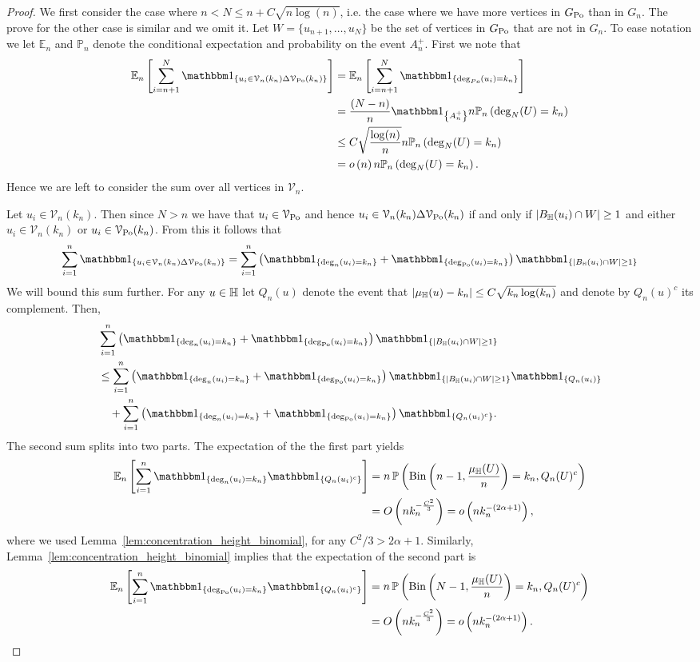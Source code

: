 \begin{proof}
We first consider the case where $n < N \le n + C\sqrt{n \log(n)}$, i.e. the case where we have more vertices in $G_{\text{Po}}$ than in $G_n$. The prove for the other case is similar and we omit it. Let $W = \{u_{n+1}, \dots, u_N\}$ be the set of vertices in $G_{\text{Po}}$ that are not in $G_n$. To ease notation we let $\mathbb{E}_n$ and $\mathbb{P}_n$ denote the conditional expectation and probability on the event $A_n^+$. First we note that
\begin{align*}
	\Expn{\sum_{i = n+1}^N \ind{u_i \in \mathcal{V}_n(k_n) \Delta \VPo(k_n)}}
	&= \Expn{\sum_{i = n+1}^N \ind{\deg_{Po}(u_i) = k_n}} \\
	&= \frac{(N-n)}{n}\ind{A_n^+} n \Probn{\deg_N(U) = k_n} \\
	&\le C \sqrt{\frac{\log(n)}{n}} n \Probn{\deg_N(U) = k_n} \\
	&= \smallO{n} n \Probn{\deg_N(U) = k_n}. 
\end{align*}
Hence we are left to consider the sum over all vertices in $\mathcal{V}_n$.

Let $u_i \in \mathcal{V}_n(k_n)$. Then since $N > n$ we have that $u_i \in \mathcal{V}_{{\mathrm{Po}}}$ and hence $u_i \in \mathcal{V}_n(k_n) \Delta \mathcal{V}_{{\mathrm{Po}}}(k_n)$ if and only if $|B_{\mathbb{H}}(u_i) \cap W| \ge 1$ and either $u_i \in \mathcal{V}_n(k_n)$ or $u_i \in \mathcal{V}_{{\mathrm{Po}}}(k_n)$.
From this it follows that
\[
	\sum_{i = 1}^n \ind{u_i \in \mathcal{V}_n(k_n) \Delta \VPo(k_n)}
	= \sum_{i = 1}^n \left(\ind{\deg_n(u_i) = k_n} + \ind{\deg_\Po(u_i) = k_n} \right)\ind{|B_\H(u_i) \cap W| \ge 1}
\]
We will bound this sum further. For any $u \in \mathbb{H}$ let $Q_n(u)$ denote the event that $|\mu_{\mathbb{H}}(u) - k_n| \le C \sqrt{k_n \log(k_n)}$ and denote by $Q_n(u)^c$ its complement. Then, 
\begin{align*}
	&\sum_{i = 1}^n \left(\ind{\deg_n(u_i) = k_n} + \ind{\deg_\Po(u_i) = k_n} \right)\ind{|B_\H(u_i) \cap W| \ge 1}\\
	&\le \sum_{i = 1}^n \left(\ind{\deg_n(u_i) = k_n} + \ind{\deg_\Po(u_i) = k_n} \right)
		\ind{|B_\H(u_i) \cap W| \ge 1}\ind{Q_n(u_i)}\\
	&\hspace{10pt}+ \sum_{i = 1}^n \left(\ind{\deg_n(u_i) = k_n} + \ind{\deg_\Po(u_i) = k_n} \right)\ind{Q_n(u_i)^c}.
\end{align*}
The second sum splits into two parts. The expectation of the the first part yields
\begin{align*}
	\Expn{\sum_{i = 1}^n \ind{\deg_n(u_i) = k_n} \ind{Q_n(u_i)^c}}
	&= n \, \Prob{\mathrm{Bin}\left(n-1, \frac{\mu_\H(U)}{n}\right) = k_n, Q_n(U)^c}\\
	&= \bigO{n k_n^{-\frac{C^2}{3}}} = \smallO{n k_n^{-(2\alpha + 1)}},
\end{align*}
where we used Lemma~\ref{lem:concentration_height_binomial}, for any $C^2/3 > 2\alpha + 1$.
Similarly, Lemma~\ref{lem:concentration_height_binomial} implies that the expectation of the second part is
\begin{align*}
	\Expn{\sum_{i = 1}^n \ind{\deg_\Po(u_i) = k_n} \ind{Q_n(u_i)^c}}
	&= n \, \Prob{\mathrm{Bin}\left(N-1, \frac{\mu_\H(U)}{n}\right) = k_n, Q_n(U)^c}\\
	&= \bigO{n k_n^{-\frac{C^2}{3}}} = \smallO{n k_n^{-(2\alpha + 1)}}.
\end{align*}


\end{proof}
